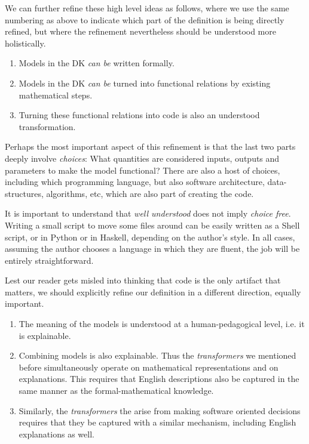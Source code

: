 \documentclass[sigconf,review]{acmart}
\begin{document}
We can further refine these high level ideas as follows, where we use
the same numbering as above to indicate which part of the definition is
being directly refined, but where the refinement nevertheless should be
understood more holistically.
\begin{enumerate}
\item Models in the DK \emph{can be} written formally.
\item Models in the DK \emph{can be} turned into functional relations by
 existing mathematical steps.
\item Turning these functional relations into code is also an understood
 transformation.
\end{enumerate}
Perhaps the most important aspect of this refinement is that the last two
parts deeply involve \emph{choices}: What quantities are considered inputs,
outputs and parameters to make the model functional? There are also a host
of choices, including which programming language, but also software
architecture, data-structures, algorithms, etc, which are also part of
creating the code.

It is important to understand that \emph{well understood} does not imply
\emph{choice free}.  Writing a small script to move some files around can
be easily written as a Shell script, or in Python or in Haskell, depending on
the author's style. In all cases, assuming the author chooses a language
in which they are fluent, the job will be entirely straightforward.

Lest our reader gets misled into thinking that code is the only artifact
that matters, we should explicitly refine our definition in a different
direction, equally important.
\begin{enumerate}
\item The meaning of the models is understood at a human-pedagogical
level, i.e. it is explainable.
\item Combining models is also explainable. Thus the \emph{transformers}
  we mentioned before %
  simultaneously operate on mathematical representations
and on explanations. This requires that English descriptions also be
captured in the same manner as the formal-mathematical knowledge.
\item Similarly, the \emph{transformers} the arise from making software
oriented decisions requires that they be captured with a similar mechanism,
including English explanations as well.
\end{enumerate}
\end{document}
